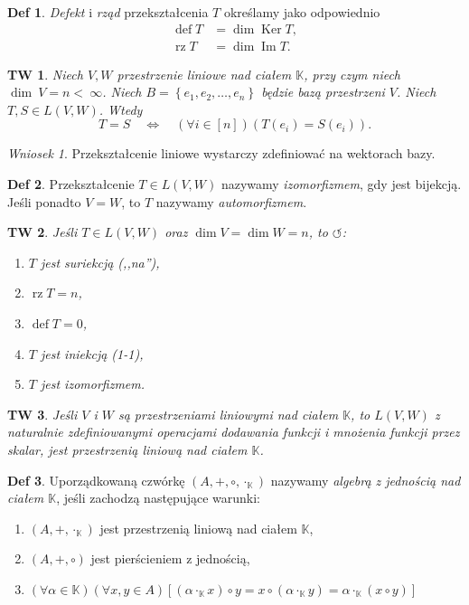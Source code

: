 \documentclass[a4paper, 12pt]{mwart}
\DeclareMathOperator{\Ima}{Im}
\DeclareMathOperator{\Ker}{Ker}
\theoremstyle{definition}
\newtheorem{definicja}{Def}[section]
\theoremstyle{plain}
\newtheorem{twierdzenie}{TW}[section]
\theoremstyle{remark}
\newtheorem{wniosek}{Wniosek}[section]
\begin{document}
\begin{definicja}
	\emph{Defekt} i \emph{rząd} przekształcenia $T$ określamy jako odpowiednio
	\begin{align}
		\operatorname{def} T &= \dim \Ker T, \\
		\operatorname{rz}  T &= \dim \Ima T.
	\end{align}
\end{definicja}
\begin{twierdzenie}
	Niech $V, W$ \ppauza przestrzenie liniowe nad ciałem $\mathbb{K}$, przy czym niech $\dim~V = n <~\infty$. Niech $B = \left\{e_1, e_2, \ldots, e_n\right\}$ będzie bazą przestrzeni $V$. Niech $T, S \in L(V, W)$. Wtedy
	\begin{equation}
		T = S \quad \iff \quad \left(\forall i \in [n]\right)\left(T(e_i) = S(e_i)\right).
	\end{equation}
\end{twierdzenie}
\begin{wniosek}
	Przekształcenie liniowe wystarczy zdefiniować na wektorach bazy.
\end{wniosek}
\begin{definicja}
	Przekształcenie $T \in L(V, W)$ nazywamy \emph{izomorfizmem}, gdy jest bijekcją. Jeśli ponadto $V = W$, to $T$ nazywamy \emph{automorfizmem}.
\end{definicja}
\begin{twierdzenie}
	Jeśli $T \in L(V, W)$ oraz $\dim V = \dim W = n$, to $\circlearrowleft$:
	\begin{enumerate}
		\item $T$ jest suriekcją (,,na''),
		\item $\operatorname{rz}T = n$,
		\item $\operatorname{def}T = 0$,
		\item $T$ jest iniekcją (1-1),
		\item $T$ jest izomorfizmem.
	\end{enumerate}
\end{twierdzenie}
\begin{twierdzenie}
	Jeśli $V$ i $W$ są przestrzeniami liniowymi nad ciałem $\mathbb{K}$, to $L(V, W)$  z naturalnie zdefiniowanymi operacjami dodawania funkcji i mnożenia funkcji przez skalar, jest przestrzenią liniową nad ciałem $\mathbb{K}$.
\end{twierdzenie}
\begin{definicja}
	Uporządkowaną czwórkę $(A, +, \circ, \cdot_\mathbb{K})$ nazywamy \emph{algebrą z jednością nad ciałem $\mathbb{K}$}, jeśli zachodzą następujące warunki:
	\begin{enumerate}
		\item $(A, +, \cdot_\mathbb{K})$ jest przestrzenią liniową nad ciałem $\mathbb{K}$,
		\item $(A, +, \circ)$ jest pierścieniem z jednością,
		\item $\left(\forall \alpha \in \mathbb{K}\right)\left(\forall x, y \in A\right)\left[(\alpha \cdot_\mathbb{K} x) \circ y = x \circ (\alpha \cdot_\mathbb{K} y) = \alpha \cdot_\mathbb{K} (x \circ y)\right]$
	\end{enumerate}
\end{definicja}
\end{document}
